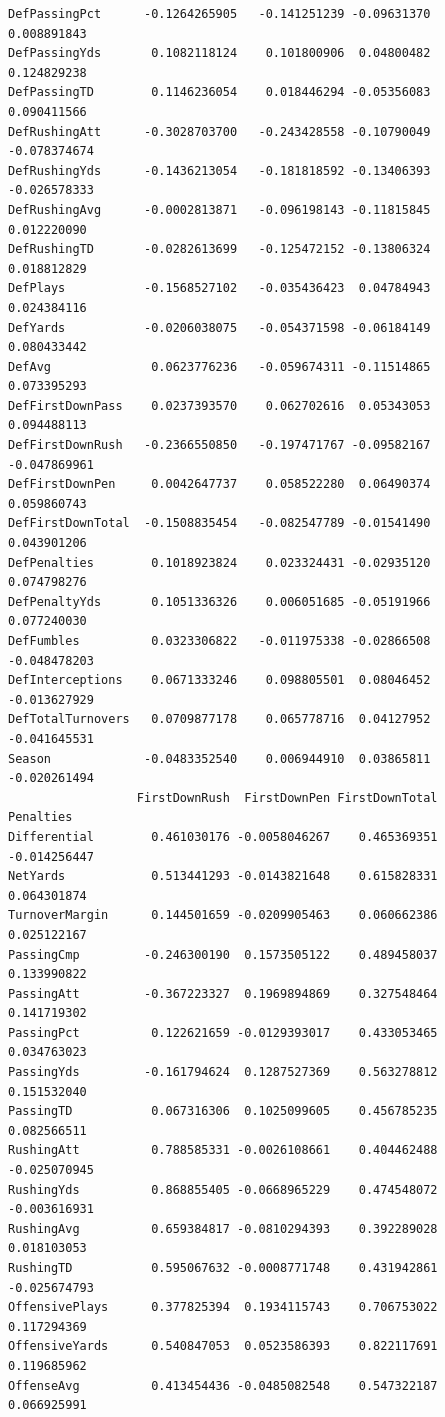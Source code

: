 \documentclass[
  letterpaper,
  DIV=11,
  numbers=noendperiod]{scrreprt}
\begin{document}
\begin{verbatim}
DefPassingPct      -0.1264265905   -0.141251239 -0.09631370   0.008891843
DefPassingYds       0.1082118124    0.101800906  0.04800482   0.124829238
DefPassingTD        0.1146236054    0.018446294 -0.05356083   0.090411566
DefRushingAtt      -0.3028703700   -0.243428558 -0.10790049  -0.078374674
DefRushingYds      -0.1436213054   -0.181818592 -0.13406393  -0.026578333
DefRushingAvg      -0.0002813871   -0.096198143 -0.11815845   0.012220090
DefRushingTD       -0.0282613699   -0.125472152 -0.13806324   0.018812829
DefPlays           -0.1568527102   -0.035436423  0.04784943   0.024384116
DefYards           -0.0206038075   -0.054371598 -0.06184149   0.080433442
DefAvg              0.0623776236   -0.059674311 -0.11514865   0.073395293
DefFirstDownPass    0.0237393570    0.062702616  0.05343053   0.094488113
DefFirstDownRush   -0.2366550850   -0.197471767 -0.09582167  -0.047869961
DefFirstDownPen     0.0042647737    0.058522280  0.06490374   0.059860743
DefFirstDownTotal  -0.1508835454   -0.082547789 -0.01541490   0.043901206
DefPenalties        0.1018923824    0.023324431 -0.02935120   0.074798276
DefPenaltyYds       0.1051336326    0.006051685 -0.05191966   0.077240030
DefFumbles          0.0323306822   -0.011975338 -0.02866508  -0.048478203
DefInterceptions    0.0671333246    0.098805501  0.08046452  -0.013627929
DefTotalTurnovers   0.0709877178    0.065778716  0.04127952  -0.041645531
Season             -0.0483352540    0.006944910  0.03865811  -0.020261494
                  FirstDownRush  FirstDownPen FirstDownTotal    Penalties
Differential        0.461030176 -0.0058046267    0.465369351 -0.014256447
NetYards            0.513441293 -0.0143821648    0.615828331  0.064301874
TurnoverMargin      0.144501659 -0.0209905463    0.060662386  0.025122167
PassingCmp         -0.246300190  0.1573505122    0.489458037  0.133990822
PassingAtt         -0.367223327  0.1969894869    0.327548464  0.141719302
PassingPct          0.122621659 -0.0129393017    0.433053465  0.034763023
PassingYds         -0.161794624  0.1287527369    0.563278812  0.151532040
PassingTD           0.067316306  0.1025099605    0.456785235  0.082566511
RushingAtt          0.788585331 -0.0026108661    0.404462488 -0.025070945
RushingYds          0.868855405 -0.0668965229    0.474548072 -0.003616931
RushingAvg          0.659384817 -0.0810294393    0.392289028  0.018103053
RushingTD           0.595067632 -0.0008771748    0.431942861 -0.025674793
OffensivePlays      0.377825394  0.1934115743    0.706753022  0.117294369
OffensiveYards      0.540847053  0.0523586393    0.822117691  0.119685962
OffenseAvg          0.413454436 -0.0485082548    0.547322187  0.066925991

\end{verbatim}
\end{document}
